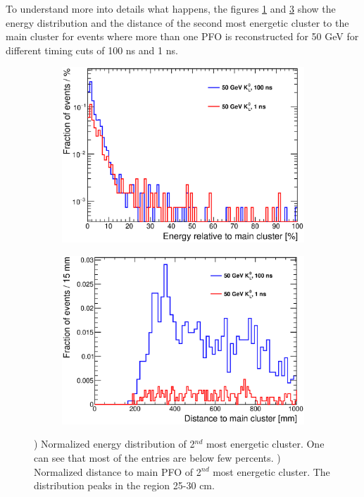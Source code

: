 To understand more into details what happens, the figures \ref{fig:Energy2ndCluster} and \ref{fig:Distance2ndCluster} show the energy distribution and the distance of the second most energetic cluster to the main cluster for events where more than one PFO is reconstructed for 50 GeV \kzeroL{} for different timing cuts of 100 ns and 1 ns.

\begin{figure}[htbp!]
  \centering
  \begin{subfigure}[t]{0.49\textwidth}
    \centering
    \includegraphics[width=1\linewidth]{../Thesis_Plots/ILD/AdditionalPlots/Plots/Energy2ndCluster_100ns_50GeV.eps}
    \caption{} \label{fig:Energy2ndCluster}
  \end{subfigure}
  \hfill
  \begin{subfigure}[t]{0.49\textwidth}
    \centering
    \includegraphics[width=1\linewidth]{../Thesis_Plots/ILD/AdditionalPlots/Plots/Distance2ndCluster_100ns_50GeV.eps}
    \caption{} \label{fig:Distance2ndCluster}
  \end{subfigure}
  \caption{) Normalized energy distribution of 2$^{nd}$ most energetic cluster. One can see that most of the entries are below few percents. ) Normalized distance to main PFO of 2$^{nd}$ most energetic cluster. The distribution peaks in the region 25-30 cm.}
\end{figure}


